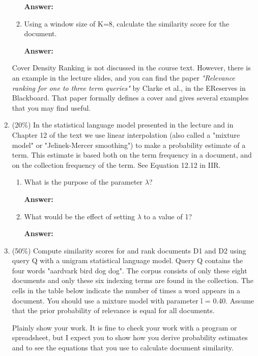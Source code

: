 \documentclass[11pt]{article}
\begin{document}
\begin{enumerate}
\begin{enumerate}
            \textbf{Answer:}

            \item Using a window size of K=8, calculate the similarity score for the document.
            
            \textbf{Answer:}

        \end{enumerate}

        Cover Density Ranking is not discussed in the course text. However, there is an example in the lecture slides, and you can find the paper \textit{"Relevance ranking for one to three term queries"} by Clarke et al., in the EReserves in Blackboard. That paper formally defines a cover and gives several examples that you may find useful.

        \item (20\%) In the statistical language model presented in the lecture and in Chapter 12 of the text we use linear interpolation (also called a "mixture model" or "Jelinek-Mercer smoothing") to make a probability estimate of a term. This estimate is based both on the term frequency in a document, and on the collection frequency of the term. See Equation 12.12 in IIR.

        \begin{enumerate}
            \item What is the purpose of the parameter $\lambda$?

            \textbf{Answer:}

            \item What would be the effect of setting $\lambda$ to a value of 1?

            \textbf{Answer:}

        \end{enumerate}

        \item (50\%) Compute similarity scores for and rank documents D1 and D2 using query Q with a unigram statistical language model. Query Q contains the four words "aardvark bird dog dog". The corpus consists of only these eight documents and only these six indexing terms are found in the collection. The cells in the table below indicate the number of times a word appears in a document. You should use a mixture model with parameter l = 0.40. Assume that the prior probability of relevance is equal for all documents.

        Plainly show your work. It is fine to check your work with a program or spreadsheet, but I expect you to show how you derive probability estimates and to see the equations that you use to calculate document similarity.


\end{enumerate}
\end{document}
